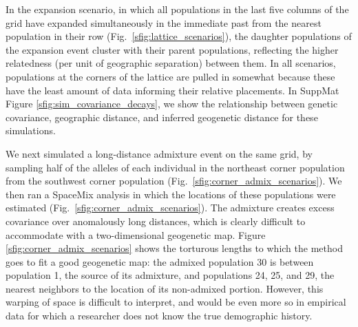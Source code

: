 \documentclass[12pt]{article}
\begin{document}
In the expansion scenario, in which all populations in the last five columns of the grid have expanded simultaneously in the immediate past from the nearest population in their row (Fig.\ \ref{sfig:lattice_scenarios}), 
the daughter populations of the expansion event cluster with their parent populations, reflecting the higher relatedness (per unit of geographic separation) between them.  
In all scenarios, populations at the corners of the lattice are pulled in somewhat
because these have the least amount of data informing their relative placements.
In SuppMat Figure \ref{sfig:sim_covariance_decays}, we show the relationship between genetic covariance, geographic distance, and inferred geogenetic distance for these simulations.

We next simulated a long-distance admixture event on the same grid,
by sampling half of the alleles of each individual in the northeast corner population from the southwest corner population (Fig.\ \ref{sfig:corner_admix_scenarios}).  We then ran a SpaceMix analysis in which the locations of these populations were estimated (Fig.\ \ref{sfig:corner_admix_scenarios}).
The admixture creates excess covariance over anomalously long distances, which is clearly difficult to accommodate with a two-dimensional geogenetic map.
Figure \ref{sfig:corner_admix_scenarios} shows the torturous lengths to which the method goes to fit a good geogenetic map: the admixed population 30 is between population 1, the source of its admixture, and populations 24, 25, and 29, the nearest neighbors to the location of its non-admixed portion.
However, this warping of space is difficult to interpret, and would be even more so in empirical data for which a researcher does not know the true demographic history.  
\end{document}
